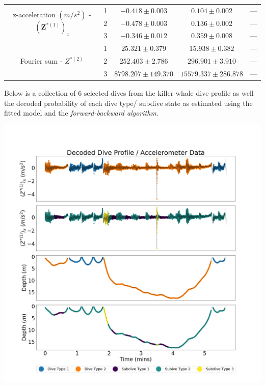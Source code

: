 \documentclass[12pt]{TD-CJS}
\begin{document}
{\begin{tabular}{ccccc}
    \multirow{3}{*}{z-acceleration $(m/s^2)$ - $\left(\mathbf{Z}^{*(1)}\right)_z$} & 1                                    & $-0.418 \pm 0.003$ & $0.104 \pm 0.002$ & ---             \\
                                                                                   & 2                                    & $-0.478 \pm 0.003$ & $0.136 \pm 0.002$ & ---             \\
                                                                                   & 3                                    & $-0.346 \pm 0.012$ & $0.359 \pm 0.008$ & ---             \\ \hline
    \multirow{3}{*}{Fourier sum - $Z^{*(2)}$}                                      & 1                                    & $25.321 \pm 0.379$ & $15.938 \pm 0.382$ & ---             \\
                                                                                   & 2                                    & $252.403 \pm 2.786$ & $296.901 \pm 3.910$ & ---             \\
                                                                                   & 3                                    & $8798.207 \pm 149.370$ & $15579.337 \pm 286.878$ & ---             \\ \hline
    \end{tabular}
}

\newpage

Below is a collection of 6 selected dives from the killer whale dive profile as well the decoded probability of each dive type/ subdive state as estimated using the fitted model and the \textit{forward-backward algorithm}.

\includegraphics[width=5.5in]{../Plots/HHMM_decoded_dives.png}
\newpage
\end{document}

